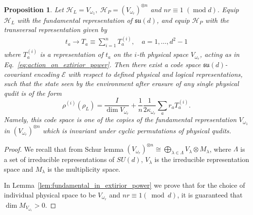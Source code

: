 \documentclass[10pt,twocolumn,superscriptaddress,aps,amsmath,amssymb,citeautoscript,floatfix,prx]{revtex4-2}
\theoremstyle{plain}
\theoremstyle{plain}
\theoremstyle{plain}
\theoremstyle{plain}
\theoremstyle{plain}
\theoremstyle{plain}
\theoremstyle{plain}
\newtheorem{smproposition}[smtheorem]{Proposition}
\theoremstyle{definition}
\theoremstyle{plain}
\begin{document}
\begin{appendix}
\begin{smproposition}\label{prop:SUdcov}
    Let
    $
        \mathcal H_L=V_{\omega_1},\;
        \mathcal H_P=(V_{\omega_r})^{\otimes n}
    $
    and $nr\equiv 1\;(\operatorname{mod} d)$.
    Equip \(\mathcal H_L\) with the fundamental representation of
    \(\mathfrak{su}(d)\), and equip \(\mathcal H_P\) with the transversal
    representation given by
    \begin{equation}
    \begin{gathered}
    t_a \rightarrow T_a \equiv \sum_{i=1}^n T_a^{(i)}, \quad a=1,\ldots,d^2-1
    \end{gathered}
    \end{equation}
    where $T_a^{(i)}$ is a representation of $t_a$ on the $i$-th physical space $V_{\omega_r}$, acting as in Eq.~\eqref{eq:action_on_extirior_power}.
    Then there exist a code space $\mathfrak{su}(d)$-covariant encoding $\mathcal{E}$ with respect to defined physical and logical representations, 
    such that the state seen by the environment after erasure of any single physical qudit is of the form   
    \[
        \rho^{(i)}\left(\rho_L\right)=\frac{I}{\operatorname{dim} V_{\omega_r}}+\frac{1}{n} \frac{1}{2\kappa_{\omega_r}} \sum_a r_a T_a^{(i)} .    
    \]
    Namely, this code space is one of the copies of the fundamental representation $V_{\omega_1}$ in $\left(V_{\omega_r}\right)^{\otimes n}$ 
    which is invariant under cyclic permutations of physical qudits.
\end{smproposition}

\begin{proof}
We recall that from Schur lemma $\left(V_{\omega_r}\right)^{\otimes n}\cong \bigoplus_{\lambda\in \Lambda} V_\lambda\otimes M_{\lambda}$, 
where $\Lambda$ is a set of irreducible representations of $SU(d)$, 
$V_\lambda$ is the irreducible representation space and $M_\lambda$ is the multiplicity space.

In Lemma~\ref{lem:fundamental_in_extirior_power} we prove that for the choice of individual physical space to be $V_{\omega_r}$ and $n r \equiv 1 (\bmod d)$, it is guaranteed 
that $\operatorname{dim} M_{V_{\omega_1}}>0$.


\end{proof}
\end{appendix}
\end{document}

